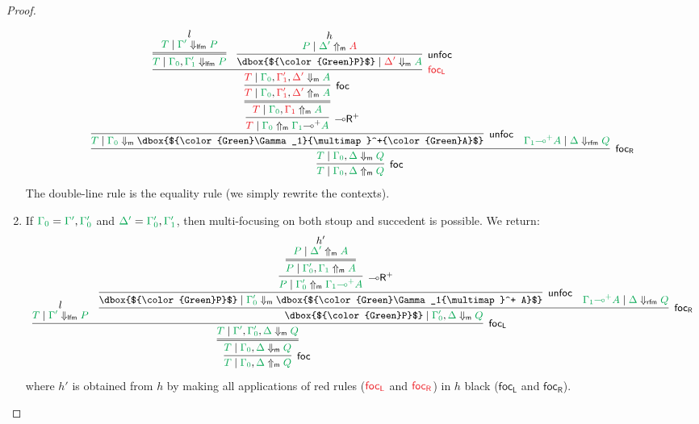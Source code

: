 \documentclass[runningheads]{llncs}
\newcommand{\lright}{{\multimap}\mathsf{R}}
\newcommand{\lolliR}{\lright}
\newcommand{\lolli}{\multimap}
\newcommand{\lfm}{\dn_\mathsf{lfm}}%
\newcommand{\rfm}{\dn_\mathsf{rfm}}%
\newcommand{\red}[1]{{\color{Red}#1}}
\newcommand{\green}[1]{{\color{Green}#1}}
\newcommand{\dn}{\Downarrow}
\newcommand{\upm}{\Uparrow_{\mathsf{m}}}
\newcommand{\dnm}{\Downarrow_{\mathsf{m}}}
\newcommand{\focL}{\mathsf{foc_L}}
\newcommand{\foc}{\mathsf{foc}}
\newcommand{\focR}{\mathsf{foc_R}}
\newcommand{\unfoc}{\mathsf{unfoc}}
\begin{document}
\begin{proof}
\begin{enumerate}
    \[\small
    \infer[\foc]{\green{T} \mid \green{\Gamma_0},\green{\Delta} \upm \green{Q}}{
      \infer[\focR]{\green{T} \mid \green{\Gamma_0},\green{\Delta} \dnm \green{Q}}{
        \infer[\unfoc]{\green{T} \mid \green{\Gamma_0} \dnm \dbox{$\green{\Gamma_1}{\lolli}^+\green{A}$}}{
          \infer[\lolliR^+]{\red{T} \mid \green{\Gamma_0} \upm \green{\Gamma_1}{\lolli}^+\green{A}}{
            \infer={\red{T} \mid \green{\Gamma_0},\red{\Gamma_1} \upm \green{A}}{
              \infer[\foc]{\red{T} \mid \green{\Gamma_0},\red{\Gamma'_1},\red{\Delta'}\upm \green{A}}{
                \infer[\red{\focL}]{\red{T} \mid \green{\Gamma_0},\red{\Gamma'_1},\red{\Delta'} \dnm \green{A}}{
                  \infer={\green{T} \mid \green{\Gamma_0},\green{\Gamma'_1} \lfm \green{P}}{
                    \deduce{\green{T} \mid \green{\Gamma'} \lfm \green{P}}{l}
                  }
                  &
                  \infer[\unfoc]{\dbox{$\green{P}$} \mid \red{\Delta'} \dnm \green{A}}{
                    \deduce{\green{P} \mid \green{\Delta'} \upm \red{A}}{h}
                  }
                }
              }
            }            
          }
        }
        &
        \green{\green{\Gamma_1}{\lolli}^+ A} \mid \green{\Delta} \rfm \green{Q}
      }
    }
    \]
    The double-line rule is the equality rule (we simply rewrite the contexts).    
  \item If $\green{\Gamma_0} = \green{\Gamma'},\green{\Gamma_{0}'}$ and $\green{\Delta'} = \green{\Gamma_{0}'},\green{\Gamma_{1}'}$, then multi-focusing on both stoup and succedent is possible. We return:
    \[\small
    \infer[\foc]{\green{T} \mid \green{\Gamma_0},\green{\Delta} \upm \green{Q}}{
      \infer={\green{T} \mid \green{\Gamma_0} ,\green{\Delta} \dnm \green{Q}}{
        \infer[\focL]{\green{T} \mid \green{\Gamma'},\green{\Gamma_{0}'},\green{\Delta} \dnm \green{Q}}{
          \deduce{\green{T} \mid \green{\Gamma'} \lfm \green{P}}{l}
          &
          \infer[\focR]{\dbox{$\green{P}$} \mid \green{\Gamma_{0}'},\green{\Delta} \dnm \green{Q}}{
            \infer[\unfoc]{\dbox{$\green{P}$} \mid \green{\Gamma_{0}'} \dnm \dbox{$\green{\Gamma_1{\lolli}^+ A}$}}{
              \infer[\lolliR^+]{\green{P} \mid \green{\Gamma_{0}'} \upm \green{\Gamma_1{\lolli}^+ A}}{
                \infer={\green{P} \mid \green{\Gamma_{0}'}, \green{\Gamma_1}\upm \green{A}}{
                \deduce{\green{P} \mid \green{\Delta'}\upm \green{A}}{h'}
                }
              }
            }
            &
            \green{\green{\Gamma_1}{\lolli}^+ A} \mid \green{\Delta} \rfm \green{Q}
          }
        }
      }
    }
    \]
where $h'$ is obtained from $h$ by making all applications of red rules ($\red{\focL}$ and $\red{\focR}$) in $h$ black ($\focL$ and $\focR$).
  \end{enumerate}
\end{proof}
\end{document}

